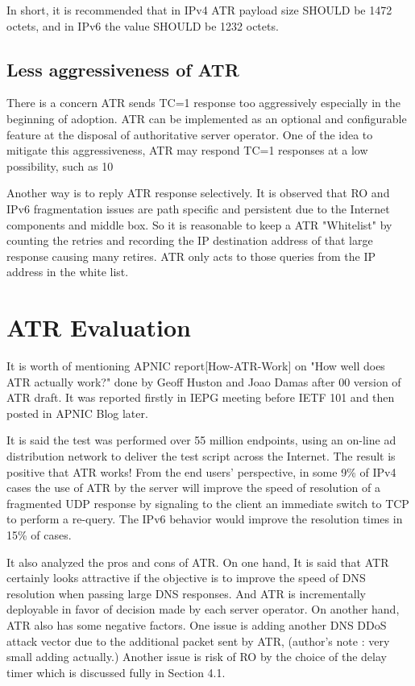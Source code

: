    In short, it is recommended that in IPv4 ATR payload size SHOULD be
   1472 octets, and in IPv6 the value SHOULD be 1232 octets.

   \subsection{Less aggressiveness of ATR}

   There is a concern ATR sends TC=1 response too aggressively
   especially in the beginning of adoption.  ATR can be implemented as
   an optional and configurable feature at the disposal of authoritative
   server operator.  One of the idea to mitigate this aggressiveness,
   ATR may respond TC=1 responses at a low possibility, such as 10%

   Another way is to reply ATR response selectively.  It is observed
   that RO and IPv6 fragmentation issues are path specific and
   persistent due to the Internet components and middle box.  So it is
   reasonable to keep a ATR "Whitelist" by counting the retries and
   recording the IP destination address of that large response causing
   many retires.  ATR only acts to those queries from the IP address in
   the white list.
 
\section{ATR Evaluation}


   It is worth of mentioning APNIC report[How-ATR-Work] on "How well
   does ATR actually work?" done by Geoff Huston and Joao Damas after 00
   version of ATR draft.  It was reported firstly in IEPG meeting before
   IETF 101 and then posted in APNIC Blog later.

   It is said the test was performed over 55 million endpoints, using an
   on-line ad distribution network to deliver the test script across the
   Internet.  The result is positive that ATR works!  From the end
   users' perspective, in some 9\% of IPv4 cases the use of ATR by the
   server will improve the speed of resolution of a fragmented UDP
   response by signaling to the client an immediate switch to TCP to
   perform a re-query.  The IPv6 behavior would improve the resolution
   times in 15\% of cases.

   It also analyzed the pros and cons of ATR.  On one hand, It is said
   that ATR certainly looks attractive if the objective is to improve
   the speed of DNS resolution when passing large DNS responses.  And
   ATR is incrementally deployable in favor of decision made by each
   server operator.  On another hand, ATR also has some negative
   factors.  One issue is adding another DNS DDoS attack vector due to
   the additional packet sent by ATR, (author's note : very small adding
   actually.)  Another issue is risk of RO by the choice of the delay
   timer which is discussed fully in Section 4.1.

